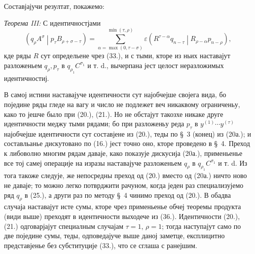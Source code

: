 ﻿\documentclass[11pt]{article}
\newcommand{\pair}[2]{\left(#1\middle|#2\right)}
\newcommand{\eps}{\varepsilon}
\begin{document}
Составјајучи резултат, покажемо:

\emph{Теорема III:} С идентичностјами
\begin{equation}
 \pair{q_\rho A^\sigma}{p_\tau B_{\rho+\sigma-\tau}}
 =\sum_{\alpha=\max(0,\tau-\sigma)}^{\min(\tau,\rho)}
 \eps\pair{R^{\tau-\alpha}q_{n-\tau}}{R_{\rho-\alpha}p_{n-\rho}},
\tag{36}
\end{equation}
кде ряды $R$ сут определьене чрез (33.), и с тыми, кторе из ньих наставајут разложеньем $q_\rho,p_\tau$ в $q_{\rho_1}C^{\sigma_1}$ и т. d., вычерпана јест целост неразложимых идентичностиј.

В самој истини наставајуче идентичности сут најобчејше својега вида, бо поједине ряды гледе на вагу и число не подлежет веч никаквому ограниченьу, како то јешче было при (20.), (21.). Но не обстајут такозхе никаке друге идентичности меджу тыми рядами; бо при разложеньу реда $p_\tau$ в $y^{(1)}\cdots y^{(\tau)}$ најобчејше идентичности сут составјене из (20.), теды по \S\ 3 (конец) из (20а.); и составльанье дискутовано по (16.) јест точно оно, кторе проведено в \S\ 4. Преход к либоволно многим рядам даваје, како показује дискусија (20а.), применьенье все тој самеј операције на изразы наставајуче разложеньем $q_\rho$ в $q_{\rho_1}C^{\sigma_1}$ и т. d. Из тога такоже следује, же непосредны преход од (20.) вместо од (20а.) ничто ново не даваје; то можно легко потврджити рачуном, когда једен раз специализујемо ряд $q_\rho$ в (25.), а други раз по методу \S\ 4 чинимо преход од (20.). В обадва случаја наставајут исте сумы, кторе чрез применьенье обчеј теоремы продукта (види выше) преходят в идентичности выходече из (36.). Идентичности (20.), (21.) одговарјајут специалным случајам $\tau=1$, $\rho=1$; тогда наступајут само по две поједине сумы, теды, одповедајуче выше даној заметце, експлицитно представјенье без субституције (33.), что се сглаша с ранејшим.
\end{document}
